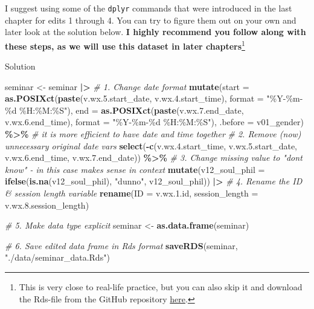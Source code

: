 \documentclass[
]{book}
\newenvironment{Shaded}{\begin{snugshade}}{\end{snugshade}}
\newcommand{\AttributeTok}[1]{\textcolor[rgb]{0.13,0.29,0.53}{#1}}
\newcommand{\CommentTok}[1]{\textcolor[rgb]{0.56,0.35,0.01}{\textit{#1}}}
\newcommand{\FloatTok}[1]{\textcolor[rgb]{0.00,0.00,0.81}{#1}}
\newcommand{\FunctionTok}[1]{\textcolor[rgb]{0.13,0.29,0.53}{\textbf{#1}}}
\newcommand{\NormalTok}[1]{#1}
\newcommand{\OtherTok}[1]{\textcolor[rgb]{0.56,0.35,0.01}{#1}}
\newcommand{\SpecialCharTok}[1]{\textcolor[rgb]{0.81,0.36,0.00}{\textbf{#1}}}
\newcommand{\StringTok}[1]{\textcolor[rgb]{0.31,0.60,0.02}{#1}}
\begin{document}
I suggest using some of the \texttt{dplyr} commands that were introduced in the last chapter for edits 1 through 4.
You can try to figure them out on your own and later look at the solution below.
\textbf{I highly recommend you follow along with these steps, as we will use this dataset in later chapters}\footnote{This is very close to real-life practice, but you can also skip it and download the Rds-file from the GitHub repository \href{https://github.com/the-tave/psych_research_in_r/blob/main/data/seminar_data.Rds}{here}.}

Solution

\begin{Shaded}
\begin{Highlighting}[]
\NormalTok{seminar }\OtherTok{\textless{}{-}}\NormalTok{ seminar }\SpecialCharTok{|\textgreater{}} 
  \CommentTok{\# 1. Change date format }
  \FunctionTok{mutate}\NormalTok{(}\AttributeTok{start =} \FunctionTok{as.POSIXct}\NormalTok{(}\FunctionTok{paste}\NormalTok{(v.wx.}\FloatTok{5.}\NormalTok{start\_date, v.wx.}\FloatTok{4.}\NormalTok{start\_time), }\AttributeTok{format =} \StringTok{"\%Y{-}\%m{-}\%d \%H:\%M:\%S"}\NormalTok{),}
         \AttributeTok{end =} \FunctionTok{as.POSIXct}\NormalTok{(}\FunctionTok{paste}\NormalTok{(v.wx.}\FloatTok{7.}\NormalTok{end\_date, v.wx.}\FloatTok{6.}\NormalTok{end\_time), }\AttributeTok{format =} \StringTok{"\%Y{-}\%m{-}\%d \%H:\%M:\%S"}\NormalTok{), }
         \AttributeTok{.before =}\NormalTok{ v01\_gender) }\SpecialCharTok{\%\textgreater{}\%} \CommentTok{\# it is more efficient to have date and time together}
  \CommentTok{\# 2. Remove (now) unnecessary original date vars }
  \FunctionTok{select}\NormalTok{(}\SpecialCharTok{{-}}\FunctionTok{c}\NormalTok{(v.wx.}\FloatTok{4.}\NormalTok{start\_time, v.wx.}\FloatTok{5.}\NormalTok{start\_date, v.wx.}\FloatTok{6.}\NormalTok{end\_time, v.wx.}\FloatTok{7.}\NormalTok{end\_date)) }\SpecialCharTok{\%\textgreater{}\%} 
  \CommentTok{\# 3. Change missing value to "don\textquotesingle{}t know" {-} in this case makes sense in context}
  \FunctionTok{mutate}\NormalTok{(}\AttributeTok{v12\_soul\_phil =} \FunctionTok{ifelse}\NormalTok{(}\FunctionTok{is.na}\NormalTok{(v12\_soul\_phil), }\StringTok{"dunno"}\NormalTok{, v12\_soul\_phil)) }\SpecialCharTok{|\textgreater{}} 
  \CommentTok{\# 4. Rename the ID \& session length variable}
  \FunctionTok{rename}\NormalTok{(}\AttributeTok{ID =}\NormalTok{ v.wx.}\FloatTok{1.}\NormalTok{id,}
         \AttributeTok{session\_length =}\NormalTok{ v.wx.}\FloatTok{8.}\NormalTok{session\_length)}

\CommentTok{\# 5. Make data type explicit}
\NormalTok{seminar }\OtherTok{\textless{}{-}} \FunctionTok{as.data.frame}\NormalTok{(seminar)}

\CommentTok{\# 6. Save edited data frame in Rds format}
\FunctionTok{saveRDS}\NormalTok{(seminar, }\StringTok{"./data/seminar\_data.Rds"}\NormalTok{)}
\end{Highlighting}
\end{Shaded}
\end{document}
